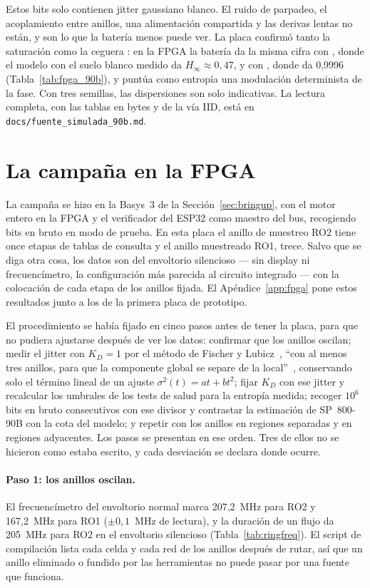 Estos bits solo contienen jitter gaussiano blanco. El ruido de parpadeo,
el acoplamiento entre anillos, una alimentación compartida y las derivas
lentas no están, y son lo que la batería menos puede ver. La placa
confirmó tanto la saturación como la ceguera \meas{}: en la \ac{FPGA} la
batería da la misma cifra con , donde el modelo con el suelo
blanco medido da $H_\infty \approx 0{,}47$, y con , donde da
0,9996 (Tabla~\ref{tab:fpga_90b}), y puntúa como entropía una modulación
determinista de la fase. Con tres semillas, las dispersiones son solo
indicativas. La lectura completa, con las tablas en bytes y de la vía
IID, está en \nolinkurl{docs/fuente_simulada_90b.md}.

\section{La campaña en la FPGA}
\label{sec:campaign}

La campaña se hizo en la Basys~3 de la Sección~\ref{sec:bringup}, con el
motor entero en la \ac{FPGA} y el verificador del ESP32 como maestro del
bus, recogiendo bits en bruto en modo de prueba. En esta placa el anillo
de muestreo RO2 tiene once etapas de tablas de consulta y el anillo
muestreado RO1, trece. Salvo que se diga otra cosa, los datos son del
envoltorio silencioso --- sin display ni frecuencímetro, la configuración
más parecida al circuito integrado --- con la colocación de cada etapa de
los anillos fijada. El Apéndice~\ref{app:fpga} pone estos resultados
junto a los de la primera placa de prototipo.

El procedimiento se había fijado en cinco pasos antes de tener la placa,
para que no pudiera ajustarse después de ver los datos: confirmar que los
anillos oscilan; medir el jitter con $K_D = 1$ por el método de Fischer y
Lubicz~\cite{fischer_2014_embedded}, ``con al menos tres anillos, para
que la componente global se separe de la
local''~\cite{lubicz_2024_jitter}, conservando solo el término lineal
de un ajuste $\sigma^2(t) = at + bt^2$; fijar $K_D$ con ese jitter y
recalcular los umbrales de los tests de salud para la entropía medida;
recoger $10^6$ bits en bruto consecutivos con ese divisor y contrastar la
estimación de SP~800-90B con la cota del modelo; y repetir con los
anillos en regiones separadas y en regiones adyacentes. Los pasos se
presentan en ese orden. Tres de ellos no se hicieron como estaba escrito,
y cada desviación se declara donde ocurre.

\paragraph{Paso 1: los anillos oscilan.} El frecuencímetro del
envoltorio normal marca 207,2~MHz para RO2 y 167,2~MHz para RO1 \meas{}
($\pm0{,}1$~MHz de lectura), y la duración de un flujo da 205~MHz para
RO2 en el envoltorio silencioso (Tabla~\ref{tab:ringfreq}). El script de
compilación lista cada celda y cada red de los anillos después de rutar,
así que un anillo eliminado o fundido por las herramientas no puede pasar
por una fuente que funciona.

